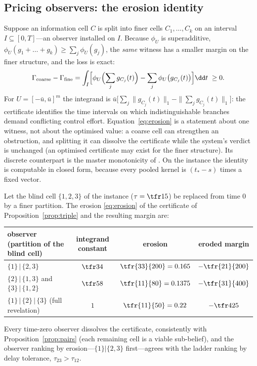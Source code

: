 \subsection{Pricing observers: the erosion identity}\label{sec:erosion}

Suppose an information cell $C$ is split into finer cells $C_1,\dots,C_k$ on an interval $I\subseteq[0,T]$---an observer installed on $I$. Because $\phi_U$ is superadditive, $\phi_U(g_1+\dots+g_k)\ge\sum_j\phi_U(g_j)$, the \emph{same} witness has a smaller margin on the finer structure, and the loss is exact:
\begin{equation}\label{eq:erosion}
\Gamma_{\mathrm{coarse}}-\Gamma_{\mathrm{fine}}=\int_I\Bigl[\phi_U\Bigl(\sum_jg_{C_j}(t)\Bigr)-\sum_j\phi_U\bigl(g_{C_j}(t)\bigr)\Bigr]\dd t\;\ge0 .
\end{equation}
For $U=[-\bar u,\bar u]^m$ the integrand is $\bar u\bigl[\sum_j\|g_{C_j}(t)\|_1-\|\sum_jg_{C_j}(t)\|_1\bigr]$: the certificate identifies the time intervals on which indistinguishable branches demand conflicting control effort. Equation~\eqref{eq:erosion} is a statement about one witness, not about the optimised value: a coarse cell can strengthen an obstruction, and splitting it can dissolve the certificate while the system's verdict is unchanged (an optimised certificate may exist for the finer structure). Its discrete counterpart is the master monotonicity of \cite{Abaee2026worked}. On the instance the identity is computable in closed form, because every pooled kernel is $(t_\ast-s)$ times a fixed vector.

\begin{proposition}\label{prop:erosionrows}
Let the blind cell $\{1,2,3\}$ of the instance ($\tau=\tfr15$) be replaced from time $0$ by a finer partition. The erosion \eqref{eq:erosion} of the certificate of Proposition~\ref{prop:triple} and the resulting margin are:
\begin{center}\small
\begin{tabular}{@{}lccc@{}}
\toprule
observer (partition of the blind cell) & integrand constant & erosion & eroded margin\\
\midrule
$\{1\}\,|\,\{2,3\}$ & $\tfr34$ & $\tfr{33}{200}=0.165$ & $-\tfr{21}{200}$\\
$\{2\}\,|\,\{1,3\}$ and $\{3\}\,|\,\{1,2\}$ & $\tfr58$ & $\tfr{11}{80}=0.1375$ & $-\tfr{31}{400}$\\
$\{1\}\,|\,\{2\}\,|\,\{3\}$ (full revelation) & $1$ & $\tfr{11}{50}=0.22$ & $-\tfr4{25}$\\
\bottomrule
\end{tabular}
\end{center}
Every time-zero observer dissolves the certificate, consistently with Proposition~\ref{prop:pairs} (each remaining cell is a viable sub-belief), and the observer ranking by erosion---$\{1\}|\{2,3\}$ first---agrees with the ladder ranking by delay tolerance, $\tau_{23}>\tau_{12}$.
\end{proposition}

